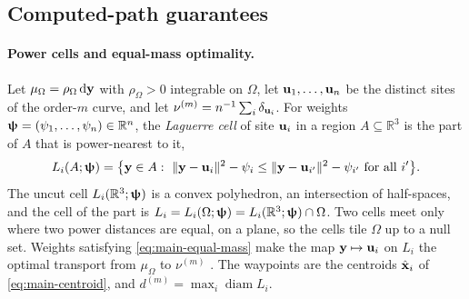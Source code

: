 \subsection{Computed-path guarantees}
\label{sec:vsfc-semidiscrete}

\paragraph{Power cells and equal-mass optimality.}
Let $\mu_\Omega=\rho_\Omega\,\mathrm{d}{\bm{\mathrm{y}}}$ with $\rho_\Omega>0$ integrable on $\Omega$, let ${\bm{\mathrm{u}}}_1,\dots,{\bm{\mathrm{u}}}_n$ be the distinct sites of the order-$m$ curve, and let $\nu^{(m)}=n^{-1}\sum_i\delta_{{\bm{\mathrm{u}}}_i}$. For weights ${\bm{\mathrm{\uppsi}}}=(\psi_1,\dots,\psi_n)\in\mathbb R^n$, the \emph{Laguerre cell} of site ${\bm{\mathrm{u}}}_i$ in a region $A\subseteq\mathbb R^3$ is the part of $A$ that is power-nearest to it,
\begin{equation}
  \label{eq:vsfc-laguerre}
  L_i(A;{\vect{\uppsi}})=\bigl\{{\vect{y}}\in A:\ \|{\vect{y}}-{\vect{u}}_i\|^2-\psi_i\leq\|{\vect{y}}-{\vect{u}}_{i'}\|^2-\psi_{i'}\ \text{for all }i'\bigr\}.
\end{equation}
The uncut cell $L_i(\mathbb R^3;{\bm{\mathrm{\uppsi}}})$ is a convex polyhedron, an intersection of half-spaces, and the cell of the part is $L_i=L_i(\Omega;{\bm{\mathrm{\uppsi}}})=L_i(\mathbb R^3;{\bm{\mathrm{\uppsi}}})\cap\Omega$. Two cells meet only where two power distances are equal, on a plane, so the cells tile $\Omega$ up to a null set. Weights satisfying \eqref{eq:main-equal-mass} make the map ${\bm{\mathrm{y}}}\mapsto {\bm{\mathrm{u}}}_i$ on $L_i$ the optimal transport from $\mu_\Omega$ to $\nu^{(m)}$ \cite{aurenhammer1998minkowski,merigot2011multiscale,levy2015numerical}. The waypoints are the centroids $\hat {\bm{\mathrm{x}}}_i$ of \eqref{eq:main-centroid}, and $d^{(m)}=\max_i\operatorname{diam}L_i$.

